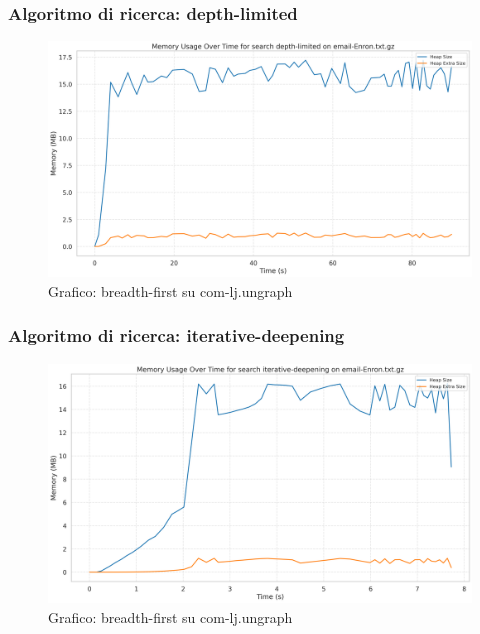 \documentclass{article}
\begin{document}
\subsubsection{Algoritmo di ricerca: depth-limited}
\begin{figure}[h]\centering
\includegraphics[width=\textwidth]{../plots/email-Enron_depth-limited.png}
\caption{Grafico: breadth-first su com-lj.ungraph}
\end{figure}
\subsubsection{Algoritmo di ricerca: iterative-deepening}
\begin{figure}[h]\centering
\includegraphics[width=\textwidth]{../plots/email-Enron_iterative-deepening.png}
\caption{Grafico: breadth-first su com-lj.ungraph}
\end{figure}
\end{document}
